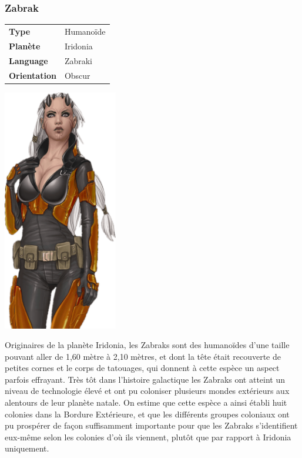 \subsubsection{Zabrak}
\begin{samepage}
	\begin{flushright}
		\begin{tabular}{ l l }
			\textbf{Type} 			& Humanoïde \\
		   	\textbf{Planète} 		& Iridonia \\
		   	\textbf{Language} 		& Zabraki \\
		   	\textbf{Orientation} 	& Obscur \\
		\end{tabular}
	\end{flushright}
	\vspace{-6\baselineskip}
	\includegraphics[width=5cm]{img/personnages/races/zabrak.png}
\end{samepage}

Originaires de la planète Iridonia, les Zabraks sont des humanoïdes d'une taille pouvant aller de 1,60 mètre à 2,10 mètres, et dont la tête était recouverte de petites cornes et le corps de tatouages, qui donnent à cette espèce un aspect parfois effrayant. Très tôt dans l'histoire galactique les Zabraks ont atteint un niveau de technologie élevé et ont pu coloniser plusieurs mondes extérieurs aux alentours de leur planète natale. On estime que cette espèce a ainsi établi huit colonies dans la Bordure Extérieure, et que les différents groupes coloniaux ont pu prospérer de façon suffisamment importante pour que les Zabraks s'identifient eux-même selon les colonies d'où ils viennent, plutôt que par rapport à Iridonia uniquement.

